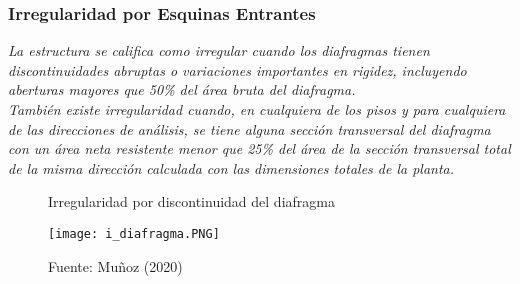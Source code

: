 \documentclass{article}%
\begin{document}
%


\begin{table}[ht!]%
\centering%
\caption{Irregularidad Torsional}%
%
\end{table}

%
\subsubsection{Irregularidad por Esquinas Entrantes}%
\label{ssubsec:IrregularidadporEsquinasEntrantes}%
\begin{tcolorbox}[colback=gray!5!white,colframe=cyan!75!black,fonttitle=\bfseries,title=Tabla N°9 E-030]%
\textit{La estructura se califica como irregular cuando los diafragmas tienen discontinuidades abruptas o variaciones importantes en rigidez, incluyendo aberturas mayores que 50\% del área bruta del diafragma.} \\ \textit{También  existe  irregularidad  cuando,  en  cualquiera de  los pisos y para cualquiera de las direcciones de análisis, se tiene alguna sección transversal del diafragma con un área neta resistente menor que 25\% del área de la sección transversal total de la misma dirección calculada con las dimensiones totales de la planta.}%
\end{tcolorbox}%


\begin{figure}[ht!]%
\centering%
\caption{Irregularidad por discontinuidad del diafragma}%
\texttt{[image: i\_diafragma.PNG]}%
\caption*{\small Fuente: Muñoz (2020)}%
\end{figure}
\end{document}
